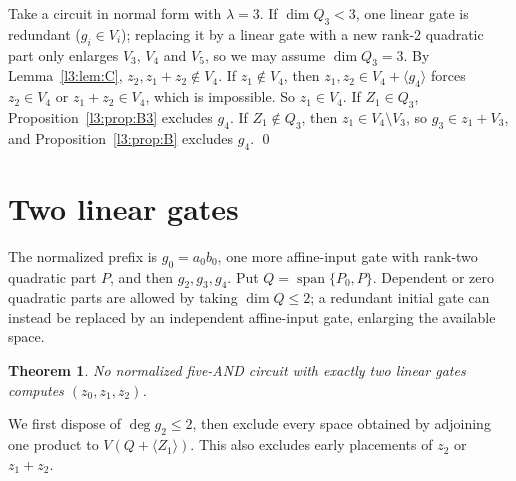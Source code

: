 \documentclass[11pt,a4paper]{article}
\theoremstyle{plain}
\newtheorem{theorem}{Theorem}
\theoremstyle{remark}
\newcommand{\Span}{\operatorname{span}}
\begin{document}
Take a circuit in normal form with $\lambda=3$. If $\dim Q_3<3$, one linear gate is redundant ($g_i\in V_i$); replacing it by a linear gate with a new rank-2 quadratic part only enlarges $V_3$, $V_4$ and $V_5$, so we may assume $\dim Q_3=3$. By Lemma~\ref{l3:lem:C}, $z_2,z_1+z_2\notin V_4$. If $z_1\notin V_4$, then $z_1,z_2\in V_4+\langle g_4\rangle$ forces $z_2\in V_4$ or $z_1+z_2\in V_4$, which is impossible. So $z_1\in V_4$.
If $Z_1\in Q_3$, Proposition~\ref{l3:prop:B3} excludes $g_4$.
If $Z_1\notin Q_3$, then $z_1\in V_4\setminus V_3$, so $g_3\in z_1+V_3$, and Proposition~\ref{l3:prop:B} excludes $g_4$. \qed

\section{Two linear gates}\label{sec:lambda2}
The normalized prefix is $g_0=a_0b_0$, one more affine-input gate with rank-two quadratic part $P$, and then $g_2,g_3,g_4$. Put $Q=\Span\{P_0,P\}$. Dependent or zero quadratic parts are allowed by taking $\dim Q\le2$; a redundant initial gate can instead be replaced by an independent affine-input gate, enlarging the available space.


\begin{theorem}\label{l2:thm:main}
No normalized five-AND circuit with exactly two linear gates computes $(z_0,z_1,z_2)$.
\end{theorem}
We first dispose of $\deg g_2\le2$, then exclude every space obtained by adjoining one product to $V(Q+\langle Z_1\rangle)$. This also excludes early placements of $z_2$ or $z_1+z_2$.
\end{document}
